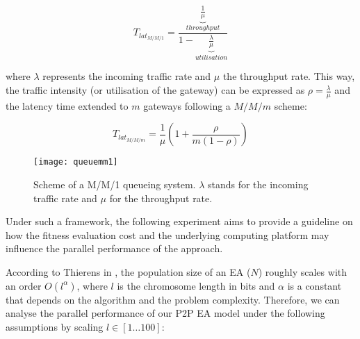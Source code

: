 \begin{equation}
T_{lat_{M/M/1}}=\frac{\underbrace{\frac{1}{\mu}}_{throughput}}{1-\underbrace{\frac{\lambda}{\mu}}_{utilisation}}
\end{equation}

\noindent where $\lambda$ represents the incoming traffic rate and $\mu$ the throughput rate. This way, the traffic intensity (or utilisation of the gateway) can be expressed as $\rho=\frac{\lambda}{\mu}$ and the latency time  extended to $m$ gateways following a $M/M/m$ scheme:

\begin{equation}
T_{lat_{M/M/m}}=\frac{1}{\mu}(1+\frac{\rho}{m(1-\rho)})
\end{equation}


\begin{figure*}[htbp]
\centerline{
\texttt{[image: queuemm1]}
}
\caption{Scheme of a M/M/1 queueing system. $\lambda$ stands for the incoming traffic rate and $\mu$ for the throughput rate.}
\label{fig:singlequeue}
\end{figure*}


Under such a framework, the following experiment aims to provide a guideline on how the fitness evaluation cost and the underlying computing platform may influence the parallel performance of the \evag approach. 

According to Thierens in \cite{thierens:scalability}, the population size of an EA ($N$) roughly scales with an order $O(l^\alpha)$, where $l$ is the chromosome length in bits and $\alpha$ is a constant that depends on the algorithm and the problem complexity. Therefore, we can analyse the parallel performance of our P2P EA model under the following assumptions by scaling $l \in [1\dots100]$:

